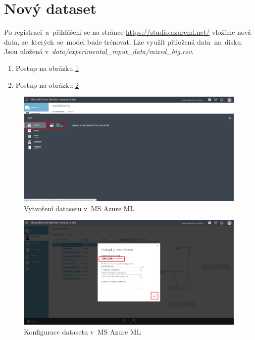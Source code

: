 \documentclass[thesis=M,czech]{FITthesis}[2012/10/20]
\newcommand{\tmpframe}[1]{\fbox{#1}}
\renewcommand{\tmpframe}[1]{#1}
\begin{document}
	\section{Nový dataset}
		Po registraci~a~přihlášení se na stránce \url{https://studio.azureml.net/} vložíme nová data, ze~kterých~se~model bude trénovat. Lze využít přiložená data~na~disku. Jsou uložená v~\textit{data/experimental\_input\_data/mixed\_big.csv}.
		
		\begin{enumerate}
			\item Postup na obrázku \ref{fig:azure-dataset01}
			\item Postup na obrázku \ref{fig:azure-dataset02}
		\end{enumerate}
		
		\begin{figure}[htb]\centering
			\tmpframe{\includegraphics[width=\textwidth]{./img/azure/dataset01}}	
			\caption{Vytvoření datasetu v~MS Azure ML}
			\label{fig:azure-dataset01}
		\end{figure}
	
		\begin{figure}[htb]\centering
			\tmpframe{\includegraphics[width=\textwidth]{./img/azure/dataset02}}	
			\caption{Konfigurace datasetu v~MS Azure ML}
			\label{fig:azure-dataset02}
		\end{figure}
	
\end{document}
